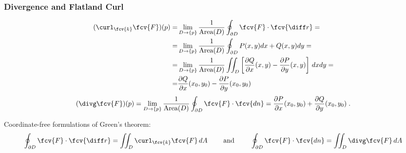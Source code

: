 \begin{frame}
\small
  \frametitle{Divergence and Flatland Curl}

  \begin{align*}(\curl_{\fcv{k}} \fcv{F})(p) = &  \lim_{D \to \{ p \}}  \frac{1}{\text{Area}(D)} \oint_{\partial D} \fcv{F} \cdot \fcv{\diff r} = \\
  =& \lim_{D \to \{ p \}}  \frac{1}{\text{Area}(D)} \oint_{\partial D} P(x,y) dx+Q(x,y)dy = \\
  = & \lim_{D \to \{ p\}}  \frac{1}{\text{Area}(D)} \iint_{D} \left[\frac{\partial Q}{\partial x} (x,y) - \frac{\partial P}{\partial y} (x,y) \right] \, dxdy = \\
  = & \frac{\partial Q}{\partial x} (x_0,y_0) - \frac{\partial P}{\partial y} (x_0,y_0)
  \end{align*}
%
\[
  (\divg \fcv{F})(p) = \lim_{D \to \{p\}} \frac{1}{\text{Area}(D)} \oint_{\partial D} \fcv{F} \cdot \fcv{dn}   = \frac{\partial P}{\partial x} (x_0,y_0) + \frac{\partial Q}{\partial y} (x_0,y_0) \; .
\]

\pause Coordinate-free formulations of Green's theorem:
%
$$\oint_{\partial D} \fcv{F} \cdot \fcv{\diff r} = \iint_D \curl_{\fcv{k}} \fcv{F} \, dA \qquad \text{ and } \qquad
\oint_{\partial D} \fcv{F} \cdot \fcv{dn} = \iint_{D} \divg \fcv{F} \, dA$$

\end{frame}